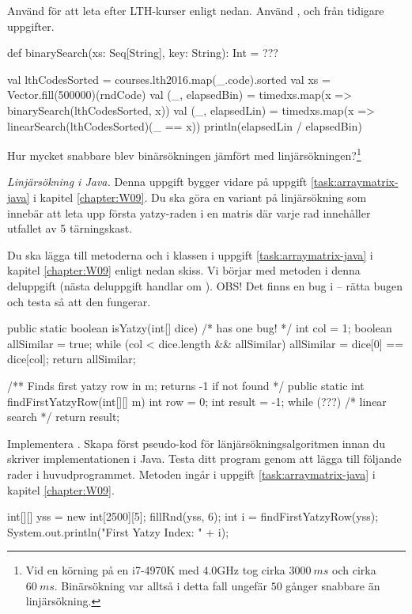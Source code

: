 \Subtask Använd  för att leta efter LTH-kurser enligt nedan. Använd ,  och  från tidigare uppgifter.
\begin{Code}
def binarySearch(xs: Seq[String], key: String): Int = ??? 

val lthCodesSorted = courses.lth2016.map(_.code).sorted
val xs = Vector.fill(500000)(rndCode)
val (_, elapsedBin) = 
  timed{xs.map(x => binarySearch(lthCodesSorted, x))}
val (_, elapsedLin) = 
  timed{xs.map(x => linearSearch(lthCodesSorted)(_ == x))}
println(elapsedLin / elapsedBin)
\end{Code}


\Subtask Hur mycket snabbare blev binärsökningen jämfört med linjärsökningen?\footnote{Vid en körning på en i7-4970K med 4.0GHz tog  cirka $3000~ms$ och  cirka $60~ms$. Binärsökning var alltså i detta fall ungefär $50$ gånger snabbare än linjärsökning.}



\Task \emph{Linjärsökning i Java.} Denna uppgift bygger vidare på uppgift \ref{task:arraymatrix-java} i kapitel \ref{chapter:W09}. Du ska göra en variant på linjärsökning som innebär att leta upp första yatzy-raden i en matris där varje rad innehåller utfallet av 5 tärningskast. 

\Subtask Du ska lägga till metoderna  och  i klassen  i uppgift \ref{task:arraymatrix-java} i kapitel \ref{chapter:W09} enligt nedan skiss. Vi börjar med metoden   i denna deluppgift (nästa deluppgift handlar om ). OBS! Det finns en bug i  -- rätta bugen och testa så att den fungerar. 

\begin{Code}[language=Java]
    public static boolean isYatzy(int[] dice){ /* has one bug! */
        int col = 1;
        boolean allSimilar = true;
        while (col < dice.length && allSimilar) {
          allSimilar = dice[0] == dice[col];
        }
        return allSimilar;
    }
    
    /** Finds first yatzy row in m; returns -1 if not found */
    public static int findFirstYatzyRow(int[][] m){
        int row = 0;
        int result = -1;
        while (???) {
             /* linear search  */ 
        }
        return result;
    }
\end{Code}


\Subtask Implementera . Skapa först pseudo-kod för länjärsökningsalgoritmen innan du skriver implementationen i Java. 
Testa ditt program genom att lägga till följande rader i huvudprogrammet. 
Metoden  ingår i uppgift \ref{task:arraymatrix-java} i kapitel \ref{chapter:W09}.
\begin{Code}[language=Java]
        int[][] yss = new int[2500][5];
        fillRnd(yss, 6);
        int i = findFirstYatzyRow(yss);
        System.out.println("First Yatzy Index: " + i);
\end{Code}




